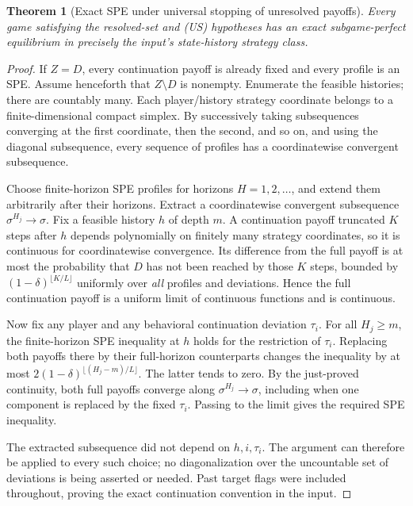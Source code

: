\documentclass[11pt,a4paper]{article}
\newtheorem{theorem}{Theorem}[section]
\theoremstyle{definition}
\theoremstyle{remark}
\begin{document}
\begin{theorem}[Exact SPE under universal stopping of unresolved payoffs]
Every game satisfying the resolved-set and (US) hypotheses has an exact subgame-perfect equilibrium in precisely the input's state-history strategy class.
\end{theorem}
\begin{proof}
If $Z=D$, every continuation payoff is already fixed and every profile is an SPE. Assume henceforth that $Z\setminus D$ is nonempty. Enumerate the feasible histories; there are countably many. Each player/history strategy coordinate belongs to a finite-dimensional compact simplex. By successively taking subsequences converging at the first coordinate, then the second, and so on, and using the diagonal subsequence, every sequence of profiles has a coordinatewise convergent subsequence.

Choose finite-horizon SPE profiles for horizons $H=1,2,\ldots$, and extend them arbitrarily after their horizons. Extract a coordinatewise convergent subsequence $\sigma^{H_j}\to\sigma$. Fix a feasible history $h$ of depth $m$. A continuation payoff truncated $K$ steps after $h$ depends polynomially on finitely many strategy coordinates, so it is continuous for coordinatewise convergence. Its difference from the full payoff is at most the probability that $D$ has not been reached by those $K$ steps, bounded by $(1-\delta)^{\lfloor K/L\rfloor}$ uniformly over \emph{all} profiles and deviations. Hence the full continuation payoff is a uniform limit of continuous functions and is continuous.

Now fix any player and any behavioral continuation deviation $\tau_i$. For all $H_j\geq m$, the finite-horizon SPE inequality at $h$ holds for the restriction of $\tau_i$. Replacing both payoffs there by their full-horizon counterparts changes the inequality by at most
$2(1-\delta)^{\lfloor(H_j-m)/L\rfloor}$.
The latter tends to zero. By the just-proved continuity, both full payoffs converge along $\sigma^{H_j}\to\sigma$, including when one component is replaced by the fixed $\tau_i$. Passing to the limit gives the required SPE inequality.

The extracted subsequence did not depend on $h,i,\tau_i$. The argument can therefore be applied to every such choice; no diagonalization over the uncountable set of deviations is being asserted or needed. Past target flags were included throughout, proving the exact continuation convention in the input.
\end{proof}
\end{document}
